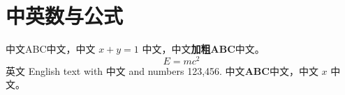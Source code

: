 \documentclass[a4paper,10pt]{article}
\begin{document}
\section{中英数与公式}
中文ABC中文，中文 $x+y=1$ 中文，中文\textbf{加粗ABC}中文。
\[ E=mc^2 \]
英文 English text with 中文 and numbers 123,456.
中文\textbf{ABC}中文，中文 $x$ 中文。
\end{document}
